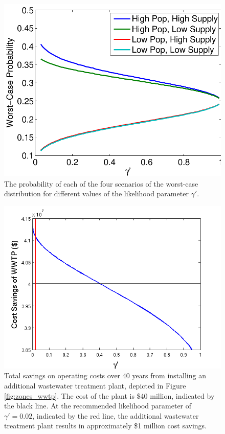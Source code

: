 \documentclass[12pt]{amsart}
\begin{document}
\begin{figure}[ht]
	\centering
	\includegraphics[width=.6\textwidth]{images/worst_case_probability}
	\caption{
		The probability of each of the four scenarios of the worst-case distribution for different values of the likelihood parameter $\gamma'$.
	}
	\label{fig:worst_case}
\end{figure}

\begin{figure}[hb]
	\centering
	\includegraphics[width=.6\textwidth]{images/worst_case_cost_savings_3}
	\caption{
		Total savings on operating costs over 40 years from installing an additional wastewater treatment plant, depicted in Figure \ref{fig:zones_wwtp}.
		The cost of the plant is \$40 million, indicated by the black line.
		At the recommended likelihood parameter of $\gamma' = 0.02$, indicated by the red line, the additional wastewater treatment plant results in approximately \$1 million cost savings.
	}
	\label{fig:worst_case_savings}
\end{figure}
\end{document}

